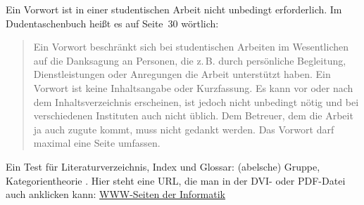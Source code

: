 Ein Vorwort ist in einer studentischen Arbeit nicht unbedingt
erforderlich.  Im Dudentaschenbuch \cite{lit01} heißt es auf
Seite~30 wörtlich:

\begin{quote}\small
Ein Vorwort beschränkt sich bei studentischen Arbeiten
im Wesentlichen auf die Danksagung an Personen, die
z.\,B. durch persönliche Begleitung, Dienstleistungen
oder Anregungen die Arbeit unterstützt haben. Ein
Vorwort ist keine Inhaltsangabe oder Kurzfassung.
Es kann vor oder nach dem Inhaltsverzeichnis
erscheinen, ist jedoch nicht unbedingt nötig und
bei verschiedenen Instituten auch nicht üblich.
Dem Betreuer, dem die Arbeit ja auch zugute kommt,
muss nicht gedankt werden. Das Vorwort darf maximal
eine Seite umfassen.
\end{quote}

Ein Test für Literaturverzeichnis, Index und Glossar:
(abelsche) Gruppe, Kategorientheorie
\cite{lit04,lit01,lit02,lit03}%
\gruppe\abelsch{}.
Hier steht eine URL, die man in der DVI- oder PDF-Datei
auch anklicken kann:
\href{http://www.cs.tu-bs.de/}{WWW-Seiten der Informatik}
